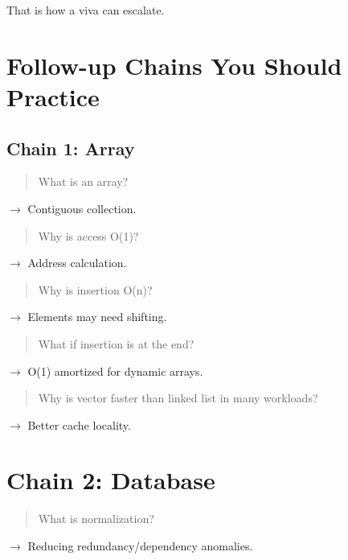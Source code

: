 That is how a viva can escalate.

\medskip

\section{Follow-up Chains You Should Practice}

\subsection{Chain 1: Array}

\begin{quote}
What is an array?\\
\end{quote}

$\rightarrow$ Contiguous collection.

\begin{quote}
Why is access O(1)?\\
\end{quote}

$\rightarrow$ Address calculation.

\begin{quote}
Why is insertion O(n)?\\
\end{quote}

$\rightarrow$ Elements may need shifting.

\begin{quote}
What if insertion is at the end?\\
\end{quote}

$\rightarrow$ O(1) amortized for dynamic arrays.

\begin{quote}
Why is vector faster than linked list in many workloads?\\
\end{quote}

$\rightarrow$ Better cache locality.

\medskip

\section{Chain 2: Database}

\begin{quote}
What is normalization?\\
\end{quote}

$\rightarrow$ Reducing redundancy/dependency anomalies.

